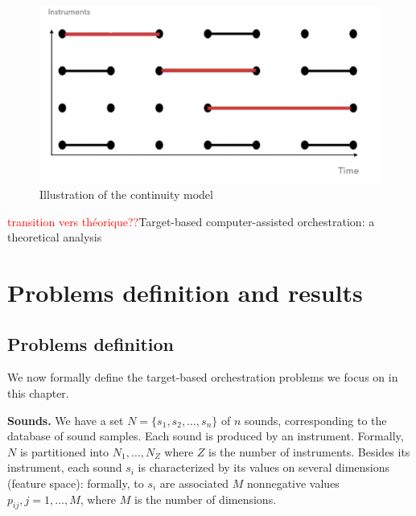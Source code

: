 \documentclass[a4paper]{book}
\newcommand{\alex}[2]{\textcolor{red}{#1}}
\begin{document}
\begin{figure}[ht!]
    \centering
    \includegraphics[scale=0.35]{contmodel.png}
    \caption{Illustration of the continuity model}
    \label{fig:contmodel}
\end{figure}

\alex{transition vers théorique??}




\chapter{Target-based computer-assisted orchestration: a theoretical analysis}
\section{Problems definition and results}
\subsection{Problems definition}\label{sec:def}


We now formally define the target-based orchestration problems we focus on in this chapter. 

{\bf Sounds.} We have a set $N=\{s_1,s_2,\dots,s_n\}$ of $n$ sounds, corresponding to the database of sound samples. Each sound is produced by  an instrument. Formally, $N$ is partitioned into $N_1,\dots,N_Z$ where $Z$ is the number of instruments. Besides its instrument, each sound $s_i$ is characterized by its values on several dimensions (feature space): formally, to $s_i$ are associated $M$ nonnegative values $p_{ij},j=1,\dots,M$, where $M$ is the number of dimensions.
\end{document}
